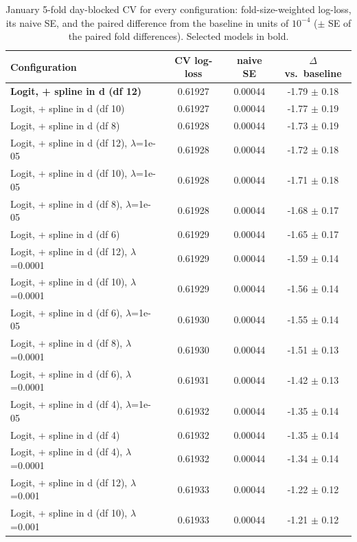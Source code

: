 \begin{table}[h]
\centering\small
\caption{January 5-fold day-blocked CV for every configuration: fold-size-weighted log-loss, its naive SE, and the paired difference from the baseline in units of $10^{-4}$ ($\pm$ SE of the paired fold differences). Selected models in bold.}
\label{tab:cv}
\begin{tabular}{lccc}
\toprule
Configuration & CV log-loss & naive SE & $\Delta$ vs.\ baseline \\
\midrule
\textbf{Logit, + spline in d (df 12)} & 0.61927 & 0.00044 & -1.79 $\pm$ 0.18 \\
Logit, + spline in d (df 10) & 0.61927 & 0.00044 & -1.77 $\pm$ 0.19 \\
Logit, + spline in d (df 8) & 0.61928 & 0.00044 & -1.73 $\pm$ 0.19 \\
Logit, + spline in d (df 12), $\lambda$=1e-05 & 0.61928 & 0.00044 & -1.72 $\pm$ 0.18 \\
Logit, + spline in d (df 10), $\lambda$=1e-05 & 0.61928 & 0.00044 & -1.71 $\pm$ 0.18 \\
Logit, + spline in d (df 8), $\lambda$=1e-05 & 0.61928 & 0.00044 & -1.68 $\pm$ 0.17 \\
Logit, + spline in d (df 6) & 0.61929 & 0.00044 & -1.65 $\pm$ 0.17 \\
Logit, + spline in d (df 12), $\lambda$=0.0001 & 0.61929 & 0.00044 & -1.59 $\pm$ 0.14 \\
Logit, + spline in d (df 10), $\lambda$=0.0001 & 0.61929 & 0.00044 & -1.56 $\pm$ 0.14 \\
Logit, + spline in d (df 6), $\lambda$=1e-05 & 0.61930 & 0.00044 & -1.55 $\pm$ 0.14 \\
Logit, + spline in d (df 8), $\lambda$=0.0001 & 0.61930 & 0.00044 & -1.51 $\pm$ 0.13 \\
Logit, + spline in d (df 6), $\lambda$=0.0001 & 0.61931 & 0.00044 & -1.42 $\pm$ 0.13 \\
Logit, + spline in d (df 4), $\lambda$=1e-05 & 0.61932 & 0.00044 & -1.35 $\pm$ 0.14 \\
Logit, + spline in d (df 4) & 0.61932 & 0.00044 & -1.35 $\pm$ 0.14 \\
Logit, + spline in d (df 4), $\lambda$=0.0001 & 0.61932 & 0.00044 & -1.34 $\pm$ 0.14 \\
Logit, + spline in d (df 12), $\lambda$=0.001 & 0.61933 & 0.00044 & -1.22 $\pm$ 0.12 \\
Logit, + spline in d (df 10), $\lambda$=0.001 & 0.61933 & 0.00044 & -1.21 $\pm$ 0.12 \\

\end{tabular}
\end{table}
